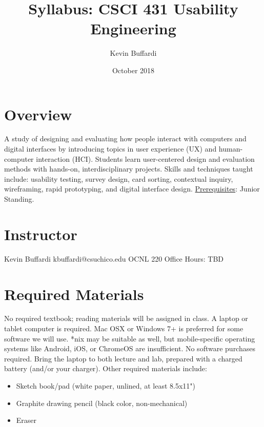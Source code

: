 \documentclass[12pt]{article}
\title{Syllabus: CSCI 431 Usability Engineering}
\author{Kevin Buffardi}
\date{October 2018}
\begin{document}
  \maketitle
  \section*{Overview}	 
  \noindent
  A study of designing and evaluating how people interact with computers and digital interfaces by introducing topics in user experience (UX) and human-computer interaction (HCI). 
  Students learn user-centered design and evaluation methods with hands-on, interdisciplinary projects.
  Skills and techniques taught include: usability testing, survey design, card sorting, contextual inquiry, wireframing, rapid prototyping, and digital interface design.
  \underline{Prerequisites}: Junior Standing.
  
  \section*{Instructor}
  \noindent
  Kevin Buffardi
  \newline
  kbuffardi@csuchico.edu
  \newline
  OCNL 220
  \newline
  Office Hours: TBD

  \section*{Required Materials}
  \noindent
  No required textbook; reading materials will be assigned in class.
  \newline
  A laptop or tablet computer is required. Mac OSX or Windows 7+ is preferred for some software we will use. *nix may be suitable as well, but mobile-specific operating systems like Android, iOS, or ChromeOS are insufficient. No software purchases required. Bring the laptop to both lecture and lab, prepared with a charged battery (and/or your charger).
  \newline
  Other required materials include:
  \begin{itemize}
    \item Sketch book/pad (white paper, unlined, at least 8.5x11")
    \item Graphite drawing pencil (black color, non-mechanical)
    \item Eraser
  \end{itemize}
\end{document}
